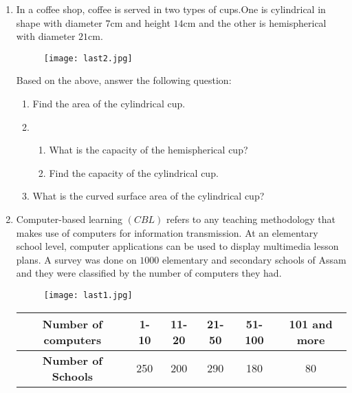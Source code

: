 \documentclass[12pt,-letter paper]{article}
\providecommand{\brak}[1]{\ensuremath{\left(#1\right)}}
\begin{document}
\begin{enumerate}
\item In a coffee shop, coffee is served in two types of cups.One is cylindrical  in shape with diameter $7 \mathrm{cm}$ and height $14 \mathrm{cm} $ and the other is hemispherical with diameter $21 \mathrm{cm}$.

	
	\begin{figure}[!ht]
		\centering
		\texttt{[image: last2.jpg]}
		\caption{}
		\label{fig:enter-label}
	\end{figure}

	\text Based on the above, answer the following question:
	\begin{enumerate}
		\item  Find the area of the cylindrical cup.
		\item
		\begin{enumerate}
			\item  What is the capacity of the hemispherical cup?
			\item Find the capacity of the cylindrical cup.
		\end{enumerate}
		\item   What is the curved surface area of the cylindrical cup?
	\end{enumerate}
\item Computer-based learning $\brak{CBL}$ refers to any teaching methodology that makes use of computers for information transmission. At an elementary school level, computer applications can be used to display multimedia lesson plans. A survey was done on $1000$ elementary and secondary schools of Assam and they were classified by the number of computers they had.

	\begin{figure}[!ht]
		\centering
		\texttt{[image: last1.jpg]}
		\caption{}
		\label{fig:enter-label}
	\end{figure}

	\begin{center}
	\begin{tabular}{|c|c|c|c|c|c|}
	\hline
	\textbf{Number of computers} & 1-10 & 11-20 & 21-50 &  51-100 & 101 and more \\
	\hline
	\textbf{Number of Schools} & 250 & 200 & 290 & 180 & 80 \\
	\hline
	\end{tabular}
	\end{center}


\end{enumerate}
\end{document}
